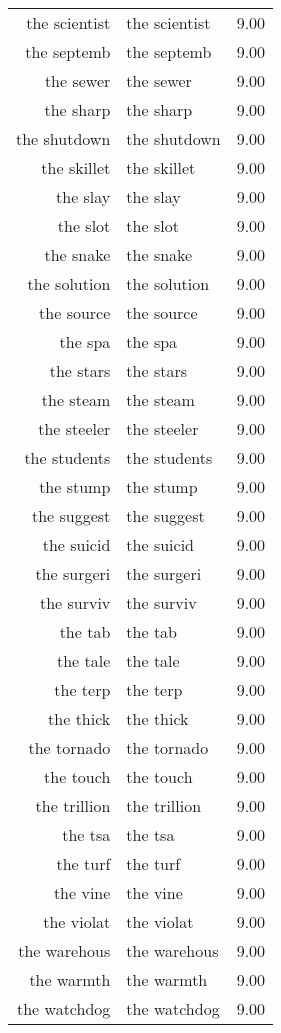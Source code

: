\begin{table}[ht]
\begin{tabular}{rlr}
  the scientist & the scientist & 9.00 \\ 
  the septemb & the septemb & 9.00 \\ 
  the sewer & the sewer & 9.00 \\ 
  the sharp & the sharp & 9.00 \\ 
  the shutdown & the shutdown & 9.00 \\ 
  the skillet & the skillet & 9.00 \\ 
  the slay & the slay & 9.00 \\ 
  the slot & the slot & 9.00 \\ 
  the snake & the snake & 9.00 \\ 
  the solution & the solution & 9.00 \\ 
  the source & the source & 9.00 \\ 
  the spa & the spa & 9.00 \\ 
  the stars & the stars & 9.00 \\ 
  the steam & the steam & 9.00 \\ 
  the steeler & the steeler & 9.00 \\ 
  the students & the students & 9.00 \\ 
  the stump & the stump & 9.00 \\ 
  the suggest & the suggest & 9.00 \\ 
  the suicid & the suicid & 9.00 \\ 
  the surgeri & the surgeri & 9.00 \\ 
  the surviv & the surviv & 9.00 \\ 
  the tab & the tab & 9.00 \\ 
  the tale & the tale & 9.00 \\ 
  the terp & the terp & 9.00 \\ 
  the thick & the thick & 9.00 \\ 
  the tornado & the tornado & 9.00 \\ 
  the touch & the touch & 9.00 \\ 
  the trillion & the trillion & 9.00 \\ 
  the tsa & the tsa & 9.00 \\ 
  the turf & the turf & 9.00 \\ 
  the vine & the vine & 9.00 \\ 
  the violat & the violat & 9.00 \\ 
  the warehous & the warehous & 9.00 \\ 
  the warmth & the warmth & 9.00 \\ 
  the watchdog & the watchdog & 9.00 \\ 

\end{tabular}
\end{table}
